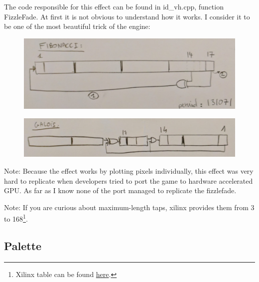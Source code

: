 The code responsible for this effect can be found in id\_vh.cpp, function FizzleFade. At first it is not obvious to understand how it works. I consider it to be one of the most beautiful trick of the engine:
\newpage


        \begin{figure}[H] \centering \includegraphics[scale=0.3]{imgs/fizzlefade/fibonnaci.png} \end{figure}
    \begin{figure}[H] \centering \includegraphics[scale=0.3]{imgs/fizzlefade/galois.png} \end{figure}
      
Note: Because the effect works by plotting pixels individually, this effect was very hard to replicate when developers tried to port the game to hardware accelerated GPU. As far as I know none of the port managed to replicate the fizzlefade.

Note: If you are curious about maximum-length taps, xilinx provides them from 3 to 168\footnote{Xilinx table can be found \href{http://www.xilinx.com/support/documentation/application\_notes/xapp052.pdf}{here}.}.










\subsection{Palette}

